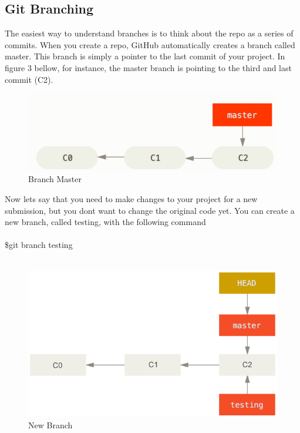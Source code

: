 \documentclass[12pt]{article}
\begin{document}
    \subsection{Git Branching}
    \label{sec:branching}
    The easiest way to understand branches is to think about the repo as a series of commits. When you create a repo, GitHub automatically creates a branch called master. This branch is simply a pointer to the last commit of your project. In figure 3 bellow, for instance, the master branch is pointing to the third and last commit (C2). \\
    \begin{figure}[h]
	\caption{Branch Master}
	\includegraphics[scale=0.5]{figure4}
	\centering
    \end{figure} 
    \vspace{0.2 in}
    Now let\textquotesingle s say that you need to make changes to your project for a new submission, but you don\textquotesingle t want to change the original code yet. You  can create a new branch, called testing, with the following command \vspace{0.2 in}\\
    \\
    \indent\indent \$git branch testing \\
    \\
    \begin{figure}[h]
	\caption{New Branch}
	\includegraphics[scale=0.5]{figure5}
	\centering
    \end{figure} 
\end{document}
